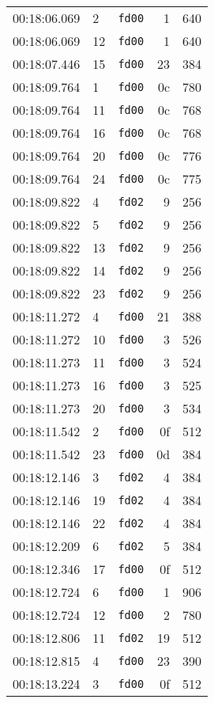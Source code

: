 \documentclass{article}
\begin{document}
\begin{longtable}{lllrr}
00:18:06.069 & 2 & \texttt{fd00} & 1 & 640 \\
00:18:06.069 & 12 & \texttt{fd00} & 1 & 640 \\
00:18:07.446 & 15 & \texttt{fd00} & 23 & 384 \\
00:18:09.764 & 1 & \texttt{fd00} & 0c & 780 \\
00:18:09.764 & 11 & \texttt{fd00} & 0c & 768 \\
00:18:09.764 & 16 & \texttt{fd00} & 0c & 768 \\
00:18:09.764 & 20 & \texttt{fd00} & 0c & 776 \\
00:18:09.764 & 24 & \texttt{fd00} & 0c & 775 \\
00:18:09.822 & 4 & \texttt{fd02} & 9 & 256 \\
00:18:09.822 & 5 & \texttt{fd02} & 9 & 256 \\
00:18:09.822 & 13 & \texttt{fd02} & 9 & 256 \\
00:18:09.822 & 14 & \texttt{fd02} & 9 & 256 \\
00:18:09.822 & 23 & \texttt{fd02} & 9 & 256 \\
00:18:11.272 & 4 & \texttt{fd00} & 21 & 388 \\
00:18:11.272 & 10 & \texttt{fd00} & 3 & 526 \\
00:18:11.273 & 11 & \texttt{fd00} & 3 & 524 \\
00:18:11.273 & 16 & \texttt{fd00} & 3 & 525 \\
00:18:11.273 & 20 & \texttt{fd00} & 3 & 534 \\
00:18:11.542 & 2 & \texttt{fd00} & 0f & 512 \\
00:18:11.542 & 23 & \texttt{fd00} & 0d & 384 \\
00:18:12.146 & 3 & \texttt{fd02} & 4 & 384 \\
00:18:12.146 & 19 & \texttt{fd02} & 4 & 384 \\
00:18:12.146 & 22 & \texttt{fd02} & 4 & 384 \\
00:18:12.209 & 6 & \texttt{fd02} & 5 & 384 \\
00:18:12.346 & 17 & \texttt{fd00} & 0f & 512 \\
00:18:12.724 & 6 & \texttt{fd00} & 1 & 906 \\
00:18:12.724 & 12 & \texttt{fd00} & 2 & 780 \\
00:18:12.806 & 11 & \texttt{fd02} & 19 & 512 \\
00:18:12.815 & 4 & \texttt{fd00} & 23 & 390 \\
00:18:13.224 & 3 & \texttt{fd00} & 0f & 512 \\

\end{longtable}
\end{document}

